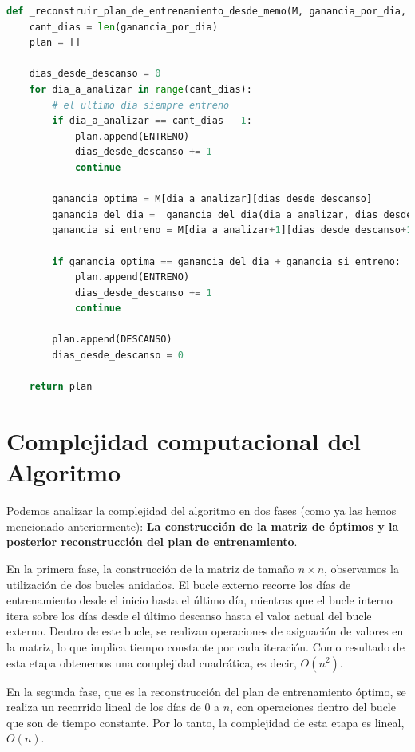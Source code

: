 \documentclass{estilo}
\begin{document}
\begin{lstlisting}[language=Python]
def _reconstruir_plan_de_entrenamiento_desde_memo(M, ganancia_por_dia, energia_por_dia) -> List[int]:
    cant_dias = len(ganancia_por_dia)
    plan = []

    dias_desde_descanso = 0
    for dia_a_analizar in range(cant_dias):
        # el ultimo dia siempre entreno
        if dia_a_analizar == cant_dias - 1:
            plan.append(ENTRENO)
            dias_desde_descanso += 1
            continue

        ganancia_optima = M[dia_a_analizar][dias_desde_descanso]
        ganancia_del_dia = _ganancia_del_dia(dia_a_analizar, dias_desde_descanso, ganancia_por_dia, energia_por_dia)
        ganancia_si_entreno = M[dia_a_analizar+1][dias_desde_descanso+1]

        if ganancia_optima == ganancia_del_dia + ganancia_si_entreno:
            plan.append(ENTRENO)
            dias_desde_descanso += 1
            continue

        plan.append(DESCANSO)
        dias_desde_descanso = 0

    return plan

\end{lstlisting}

\section{Complejidad computacional del Algoritmo}

Podemos analizar la complejidad del algoritmo en dos fases (como ya las hemos mencionado anteriormente): \textbf{La construcción de la matriz de óptimos y la posterior reconstrucción del plan de entrenamiento}. 

En la primera fase, la construcción de la matriz de tamaño $n \times n$, observamos la utilización de dos bucles anidados. El bucle externo recorre los días de entrenamiento desde el inicio hasta el último día, mientras que el bucle interno itera sobre los días desde el último descanso hasta el valor actual del bucle externo. Dentro de este bucle, se realizan operaciones de asignación de valores en la matriz, lo que implica tiempo constante por cada iteración. Como resultado de esta etapa obtenemos una complejidad cuadrática, es decir, $O(n^2)$.

En la segunda fase, que es la reconstrucción del plan de entrenamiento óptimo, se realiza un recorrido lineal de los días de 0 a $n$, con operaciones dentro del bucle que son de tiempo constante. Por lo tanto, la complejidad de esta etapa es lineal, $O(n)$. 
\end{document}

